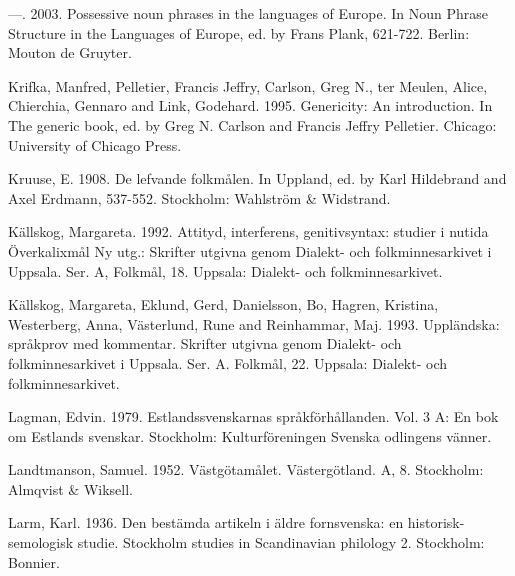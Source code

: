 —. 2003. Possessive noun phrases in the languages of Europe. In Noun Phrase Structure in the Languages of Europe, ed. by Frans Plank, 621-722. Berlin: Mouton de Gruyter.


Krifka, Manfred, Pelletier, Francis Jeffry, Carlson, Greg N., ter Meulen, Alice, Chierchia, Gennaro and Link, Godehard. 1995. Genericity: An introduction. In The generic book, ed. by Greg N. Carlson and Francis Jeffry Pelletier. Chicago: University of Chicago Press.


Kruuse, E. 1908. De lefvande folkmålen. In Uppland, ed. by Karl Hildebrand and Axel Erdmann, 537-552. Stockholm: Wahlström \& Widstrand.


Källskog, Margareta. 1992. Attityd, interferens, genitivsyntax: studier i nutida Överkalixmål Ny utg.: Skrifter utgivna genom Dialekt- och folkminnesarkivet i Uppsala. Ser. A, Folkmål, 18. Uppsala: Dialekt- och folkminnesarkivet.


Källskog, Margareta, Eklund, Gerd, Danielsson, Bo, Hagren, Kristina, Westerberg, Anna, Västerlund, Rune and Reinhammar, Maj. 1993. Uppländska: språkprov med kommentar. Skrifter utgivna genom Dialekt- och folkminnesarkivet i Uppsala. Ser. A. Folkmål, 22. Uppsala: Dialekt- och folkminnesarkivet.


Lagman, Edvin. 1979. Estlandssvenskarnas språkförhållanden. Vol. 3 A: En bok om Estlands svenskar. Stockholm: Kulturföreningen Svenska odlingens vänner.


Landtmanson, Samuel. 1952. Västgötamålet. Västergötland. A, 8. Stockholm: Almqvist \& Wiksell.


Larm, Karl. 1936. Den bestämda artikeln i äldre fornsvenska: en historisk-semologisk studie. Stockholm studies in Scandinavian philology 2. Stockholm: Bonnier.


